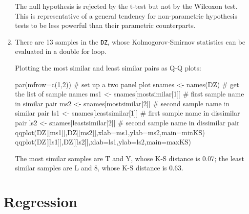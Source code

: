 \begin{enumerate}
The null hypothesis is rejected by the t-test but not by the Wilcoxon
test. This is representative of a general tendency for non-parametric
hypothesis tests to be less powerful than their parametric
counterparts.
  
\item\label{it:sol-DZ-MDS} There are 13 samples in the \texttt{DZ},
  whose Kolmogorov-Smirnov statistics can be evaluated in a double for
  loop.


Plotting the most similar and least similar pairs as Q-Q plots:

\begin{script}[firstnumber=18]
par(mfrow=c(1,2))               # set up a two panel plot
snames <- names(DZ)             # get the list of sample names
ms1 <- snames[mostsimilar[1]]   # first sample name in similar pair
ms2 <- snames[mostsimilar[2]]   # second sample name in similar pair
ls1 <- snames[leastsimilar[1]]  # first sample name in dissimilar pair
ls2 <- snames[leastsimilar[2]]  # second sample name in dissimilar pair
qqplot(DZ[[ms1]],DZ[[ms2]],xlab=ms1,ylab=ms2,main=minKS)
qqplot(DZ[[ls1]],DZ[[ls2]],xlab=ls1,ylab=ls2,main=maxKS)
\end{script}

The most similar samples are T and Y, whose K-S distance is 0.07; the
least similar samples are L and 8, whose K-S distance is 0.63.

\end{enumerate}

\section{Regression}
\label{sec:sol-regression}

